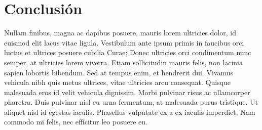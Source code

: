 \documentclass[a4paper,12pt]{article}
\begin{document}
\section{Conclusi\'on}
Nullam finibus, magna ac dapibus posuere, mauris lorem ultricies dolor, id euismod elit lacus vitae ligula. Vestibulum ante ipsum primis in faucibus orci luctus et ultrices posuere cubilia Curae; Donec ultricies orci condimentum nunc semper, at ultricies lorem viverra. Etiam sollicitudin mauris felis, non lacinia sapien lobortis bibendum. Sed at tempus enim, et hendrerit dui. Vivamus vehicula nibh quis metus ultrices, vitae ultricies arcu consequat. Quisque malesuada eros id velit vehicula dignissim. Morbi pulvinar risus ac ullamcorper pharetra. Duis pulvinar nisl eu urna fermentum, at malesuada purus tristique. Ut aliquet nisl id egestas iaculis. Phasellus vulputate ex a ex iaculis imperdiet. Nam commodo mi felis, nec efficitur leo posuere eu.
\end{document}

